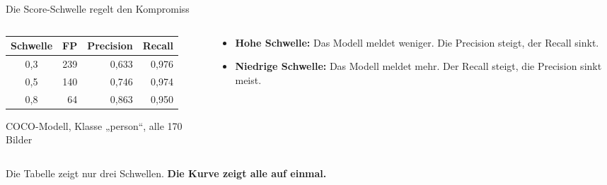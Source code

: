 \documentclass[aspectratio=169,11pt]{beamer}
\newcommand{\hl}[1]{\textbf{#1}}
\begin{document}
\begin{frame}{Die Score-Schwelle regelt den Kompromiss}
  \begin{columns}[c,onlytextwidth]
    \begin{column}{0.54\textwidth}
      \centering
      \renewcommand{\arraystretch}{1.25}
      \begin{tabular}{c r r r}
        \toprule
        \textbf{Schwelle} & \textbf{FP} & \textbf{Precision} & \textbf{Recall} \\
        \midrule
        0,3 & 239 & 0,633 & 0,976 \\
        0,5 & 140 & 0,746 & 0,974 \\
        0,8 &  64 & 0,863 & 0,950 \\
        \bottomrule
      \end{tabular}

      \vspace{2mm}
      {\scriptsize\color{grautext}COCO-Modell, Klasse „person“, alle 170 Bilder}
    \end{column}
    \begin{column}{0.42\textwidth}
      \begin{itemize}
        \setlength{\itemsep}{3mm}
        \item \hl{Hohe Schwelle:} Das Modell meldet weniger. Die Precision steigt, der Recall sinkt.
        \item \hl{Niedrige Schwelle:} Das Modell meldet mehr. Der Recall steigt, die Precision sinkt meist.
      \end{itemize}
    \end{column}
  \end{columns}

  \vspace{6mm}
  Die Tabelle zeigt nur drei Schwellen. \hl{Die Kurve zeigt alle auf einmal.}
\end{frame}
\end{document}
